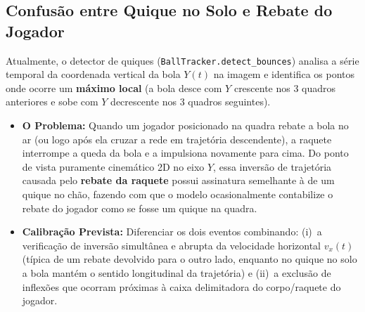 \documentclass[a4paper,11pt]{article}
\begin{document}
\subsection{Confusão entre Quique no Solo e Rebate do Jogador}
Atualmente, o detector de quiques (\texttt{BallTracker.detect\_bounces}) analisa a série temporal da coordenada vertical da bola $Y(t)$ na imagem e identifica os pontos onde ocorre um \textbf{máximo local} (a bola desce com $Y$ crescente nos 3 quadros anteriores e sobe com $Y$ decrescente nos 3 quadros seguintes).
\begin{itemize}[nosep]
  \item \textbf{O Problema:} Quando um jogador posicionado na quadra rebate a bola no ar (ou logo após ela cruzar a rede em trajetória descendente), a raquete interrompe a queda da bola e a impulsiona novamente para cima. Do ponto de vista puramente cinemático 2D no eixo $Y$, essa inversão de trajetória causada pelo \textbf{rebate da raquete} possui assinatura semelhante à de um quique no chão, fazendo com que o modelo ocasionalmente contabilize o rebate do jogador como se fosse um quique na quadra.
  \item \textbf{Calibração Prevista:} Diferenciar os dois eventos combinando: (i)~a verificação de inversão simultânea e abrupta da velocidade horizontal $v_x(t)$ (típica de um rebate devolvido para o outro lado, enquanto no quique no solo a bola mantém o sentido longitudinal da trajetória) e (ii)~a exclusão de inflexões que ocorram próximas à caixa delimitadora do corpo/raquete do jogador.
\end{itemize}
\end{document}
